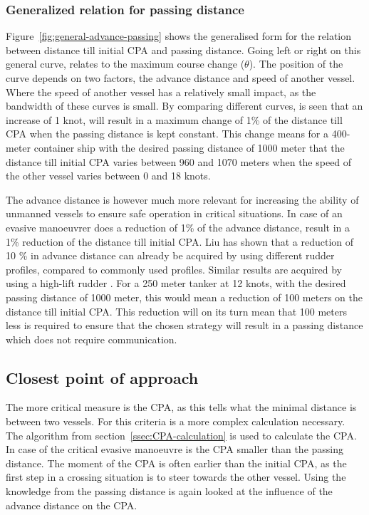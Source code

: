 \subsubsection{Generalized relation for passing distance}
Figure~\ref{fig:general-advance-passing} shows the generalised form for the relation between distance till initial CPA and passing distance.
Going left or right on this general curve, relates to the maximum course change ($\theta$). The position of the curve depends on two factors, the advance distance and speed of another vessel. Where the speed of another vessel has a relatively small impact, as the bandwidth of these curves is small. By comparing different curves, is seen that an increase of 1 knot, will result in a maximum change of 1\% of the distance till \ac{CPA} when the passing distance is kept constant. This change means for a 400-meter container ship with the desired passing distance of 1000 meter that the distance till initial CPA varies between 960 and 1070 meters when the speed of the other vessel varies between 0 and 18 knots.

The advance distance is however much more relevant for increasing the ability of unmanned vessels to ensure safe operation in critical situations. In case of an evasive manoeuvrer does a reduction of 1\% of the advance distance, result in a 1\% reduction of the distance till initial CPA.
Liu \cite{Liu2015a} has shown that a reduction of 10 \% in advance distance can already be acquired by using different rudder profiles, compared to commonly used profiles. Similar results are acquired by using a high-lift rudder \cite{Zaky2018}. For a 250 meter tanker at 12 knots, with the desired passing distance of 1000 meter, this would mean a reduction of 100 meters on the distance till initial CPA. This reduction will on its turn mean that 100 meters less is required to ensure that the chosen strategy will result in a passing distance which does not require communication.

\subsection{Closest point of approach}
The more critical measure is the \ac{CPA}, as this tells what the minimal distance is between two vessels. For this criteria is a more complex calculation necessary. The algorithm from section~\ref{ssec:CPA-calculation} is used to calculate the CPA. In case of the critical evasive manoeuvre is the CPA smaller than the passing distance. The moment of the \ac{CPA} is often earlier than the initial CPA, as the first step in a crossing situation is to steer towards the other vessel. Using the knowledge from the passing distance is again looked at the influence of the advance distance on the CPA.

